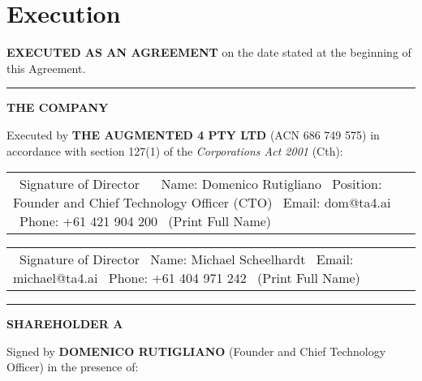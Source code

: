 \section{Execution} \label{sec:execution}

\textbf{EXECUTED AS AN AGREEMENT} on the date stated at the beginning of this Agreement.

\vspace{3ex}

\noindent\rule{\textwidth}{0.4pt} %
\vspace{2ex}

\textbf{THE COMPANY}

\vspace{2ex}

\noindent Executed by \textbf{THE AUGMENTED 4 PTY LTD} (ACN 686 749 575) in accordance with section 127(1) of the \textit{Corporations Act 2001} (Cth):

\vspace{4ex}

\begin{tabular}{@{}p{}@{}}
\hrulefill \
Signature of Director \
\vspace{1ex} \
Name: Domenico Rutigliano \
Position: Founder and Chief Technology Officer (CTO) \
Email: dom@ta4.ai \
Phone: +61 421 904 200 \
(Print Full Name)
\end{tabular}
\hspace{0.05\textwidth} %
\begin{tabular}{@{}p{}@{}}
\hrulefill \
Signature of Director %
\vspace{1ex} \
Name: Michael Scheelhardt \
Email: michael@ta4.ai \
Phone: +61 404 971 242 \
(Print Full Name)
\end{tabular}

\vspace{6ex}

\noindent\rule{\textwidth}{0.4pt} %
\vspace{2ex}

\textbf{SHAREHOLDER A}

\vspace{2ex}

\noindent Signed by \textbf{DOMENICO RUTIGLIANO} (Founder and Chief Technology Officer) in the presence of:

\vspace{4ex}

